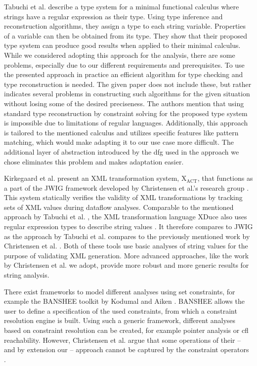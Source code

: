 Tabuchi et al. \cite{regex_types} describe a type system for a minimal functional calculus where strings have a regular expression as their type. Using type inference and reconstruction algorithms, they assign a type to each string variable. Properties of a variable can then be obtained from its type.
They show that their proposed type system can produce good results when applied to their minimal calculus. While we considered adopting this approach for the analysis, there are some problems, especially due to our different requirements and prerequisites. 
To use the presented approach in practice an efficient algorithm for type checking and type reconstruction is needed. 
The given paper does not include these, but rather indicates several problems in constructing such algorithms for the given situation without losing some of the desired preciseness.
The authors mention that using standard type reconstruction by constraint solving for the proposed type system is impossible due to limitations of regular languages.
Additionally, this approach is tailored to the mentioned calculus and utilizes specific features like pattern matching, which would make adapting it to our use case more difficult.
The additional layer of abstraction introduced by the \ac{dfg} used in the approach we chose eliminates this problem and makes adaptation easier.

Kirkegaard et al. present an XML transformation system, $\text{X}_{\text{ACT}}$, that functions as a part of the JWIG framework developed by Christensen et al.'s research group \cite{xact}. This system statically verifies the validity of XML transformations by tracking sets of XML values during dataflow analyses.
Comparable to the mentioned approach by Tabuchi et al. \cite{regex_types}, the XML transformation language XDuce also uses regular expression types to describe string values \cite{xduce}. It therefore compares to JWIG as the approach by Tabuchi et al. compares to the previously mentioned work by Christensen et al. \cite{brics}. 
Both of these tools use basic analyses of string values for the purpose of validating XML generation. More advanced approaches, like the work by Christensen et al. we adopt, provide more robust and more generic results for string analysis.

There exist frameworks to model different analyses using set constraints, for example the BANSHEE toolkit by Kodumal and Aiken \cite{banshee}. BANSHEE allows the user to define a specification of the used constraints, from which a constraint resolution engine is built. Using such a generic framework, different analyses based on constraint resolution can be created, for example pointer analysis or \ac{cfl} reachability. However, Christensen et al. argue that some operations of their -- and by extension our -- approach cannot be captured by the constraint operators \cite{brics}.

